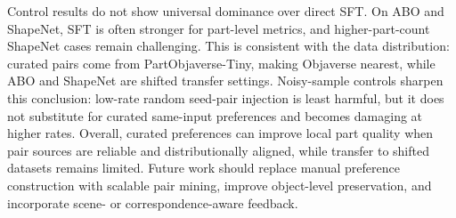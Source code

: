 \documentclass[10pt,twocolumn,letterpaper]{article}
\begin{document}
Control results do not show universal dominance over direct SFT. On ABO and ShapeNet, SFT is often stronger for part-level metrics, and higher-part-count ShapeNet cases remain challenging. This is consistent with the data distribution: curated pairs come from PartObjaverse-Tiny, making Objaverse nearest, while ABO and ShapeNet are shifted transfer settings.
Noisy-sample controls sharpen this conclusion: low-rate random seed-pair injection is least harmful, but it does not substitute for curated same-input preferences and becomes damaging at higher rates. Overall, curated preferences can improve local part quality when pair sources are reliable and distributionally aligned, while transfer to shifted datasets remains limited. Future work should replace manual preference construction with scalable pair mining, improve object-level preservation, and incorporate scene- or correspondence-aware feedback.

\FloatBarrier

{\scriptsize


}
\end{document}
